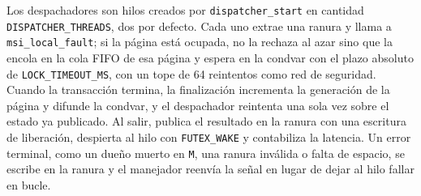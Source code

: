 Los despachadores son hilos creados por \texttt{dispatcher\_start} en cantidad \texttt{DISPATCHER\_THREADS}, dos por defecto. Cada uno extrae una ranura y llama a \texttt{msi\_local\_fault}; si la página está ocupada, no la rechaza al azar sino que la encola en la cola FIFO de esa página y espera en la condvar con el plazo absoluto de \texttt{LOCK\_TIMEOUT\_MS}, con un tope de 64 reintentos como red de seguridad. Cuando la transacción termina, la finalización incrementa la generación de la página y difunde la condvar, y el despachador reintenta una sola vez sobre el estado ya publicado. Al salir, publica el resultado en la ranura con una escritura de liberación, despierta al hilo con \texttt{FUTEX\_WAKE} y contabiliza la latencia. Un error terminal, como un dueño muerto en \texttt{M}, una ranura inválida o falta de espacio, se escribe en la ranura y el manejador reenvía la señal en lugar de dejar al hilo fallar en bucle.

